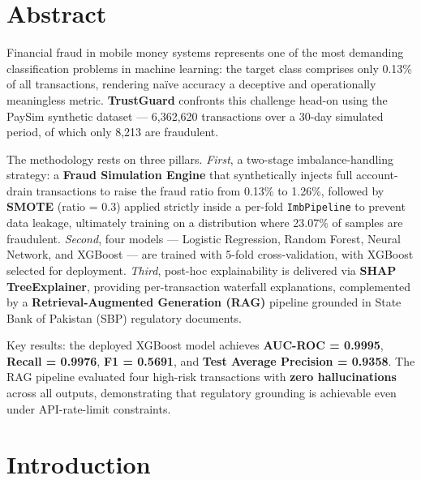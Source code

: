 \documentclass[12pt,a4paper]{article}
\begin{document}
\newpage
\tableofcontents
\newpage

\section*{Abstract}

Financial fraud in mobile money systems represents one of the most demanding classification problems in machine learning: the target class comprises only 0.13\% of all transactions, rendering na\"{i}ve accuracy a deceptive and operationally meaningless metric. \textbf{TrustGuard} confronts this challenge head-on using the PaySim synthetic dataset --- 6,362,620 transactions over a 30-day simulated period, of which only 8,213 are fraudulent.

The methodology rests on three pillars. \textit{First}, a two-stage imbalance-handling strategy: a \textbf{Fraud Simulation Engine} that synthetically injects full account-drain transactions to raise the fraud ratio from 0.13\% to 1.26\%, followed by \textbf{SMOTE} (ratio = 0.3) applied strictly inside a per-fold \texttt{ImbPipeline} to prevent data leakage, ultimately training on a distribution where 23.07\% of samples are fraudulent. \textit{Second}, four models --- Logistic Regression, Random Forest, Neural Network, and XGBoost --- are trained with 5-fold cross-validation, with XGBoost selected for deployment. \textit{Third}, post-hoc explainability is delivered via \textbf{SHAP TreeExplainer}, providing per-transaction waterfall explanations, complemented by a \textbf{Retrieval-Augmented Generation (RAG)} pipeline grounded in State Bank of Pakistan (SBP) regulatory documents.

Key results: the deployed XGBoost model achieves \textbf{AUC-ROC = 0.9995}, \textbf{Recall = 0.9976}, \textbf{F1 = 0.5691}, and \textbf{Test Average Precision = 0.9358}. The RAG pipeline evaluated four high-risk transactions with \textbf{zero hallucinations} across all outputs, demonstrating that regulatory grounding is achievable even under API-rate-limit constraints.

\section{Introduction}
\end{document}
